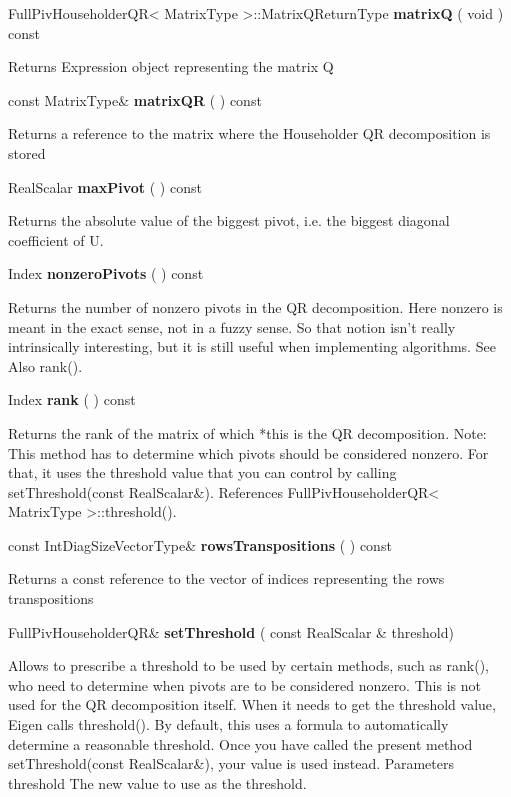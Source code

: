 \vspace{0.3cm}
FullPivHouseholderQR< MatrixType >::MatrixQReturnType \textbf{matrixQ}  ( void  )  const 

Returns Expression object representing the matrix Q 


\vspace{0.3cm}
const MatrixType\& \textbf{matrixQR}  ( )  const 

Returns a reference to the matrix where the Householder QR decomposition is stored 


\vspace{0.3cm}
RealScalar \textbf{maxPivot}  ( )  const 

Returns the absolute value of the biggest pivot, i.e. the biggest diagonal coefficient of U. 


\vspace{0.3cm}
Index \textbf{nonzeroPivots}  ( )  const 

Returns the number of nonzero pivots in the QR decomposition. Here nonzero is meant in the exact sense, not in a fuzzy sense. So that notion isn't really intrinsically interesting, but it is still useful when implementing algorithms.
See Also rank().


\vspace{0.3cm}
Index \textbf{rank}  ( )  const 

Returns the rank of the matrix of which *this is the QR decomposition.
Note: This method has to determine which pivots should be considered nonzero. For that, it uses the threshold value that you can control by calling setThreshold(const RealScalar\&). References FullPivHouseholderQR< MatrixType >::threshold().


\vspace{0.3cm}
const IntDiagSizeVectorType\& \textbf{rowsTranspositions}  ( )  const 

Returns a const reference to the vector of indices representing the rows transpositions 


\vspace{0.3cm}
FullPivHouseholderQR\& \textbf{setThreshold}  ( const RealScalar \&  threshold)   

Allows to prescribe a threshold to be used by certain methods, such as rank(), who need to determine when pivots are to be considered nonzero. This is not used for the QR decomposition itself.
When it needs to get the threshold value, Eigen calls threshold(). By default, this uses a formula to automatically determine a reasonable threshold. Once you have called the present method setThreshold(const RealScalar\&), your value is used instead.
Parameters
threshold The new value to use as the threshold. 

